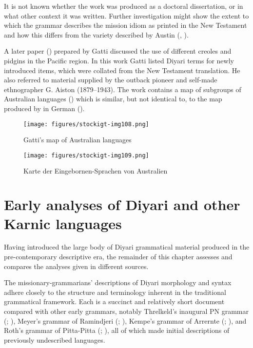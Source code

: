 It is not known whether the work was produced as a doctoral dissertation, or in what other context it was written. Further investigation might show the extent to which the grammar describes the mission idiom as printed in the New Testament and how this differs from the variety described by Austin (\citeyear{austin_grammar_1981}, \citeyear{austin_grammar_2013}).

A later paper (\citeyear{gatti_britannnia_1934}) prepared by Gatti discussed the use of different creoles and pidgins in the Pacific region. In this work Gatti listed Diyari terms for newly introduced items, which were collated from the New Testament translation. He also referred to material supplied by the outback pioneer and self-made ethnographer G. Aiston (1879--1943). The work contains a map of subgroups of Australian languages () which is similar, but not identical to, to the map produced by \citet{schmidt_gliederung_1919} in German ().


\begin{figure}
\texttt{[image: figures/stockigt-img108.png]}
\caption{Gatti's map of Australian languages \citeyearpar{gatti_britannnia_1934}}
\label{bkm:Ref76045165gatti}
\end{figure}

\begin{figure}
\texttt{[image: figures/stockigt-img109.png]}
\caption{Karte der Eingebornen-Sprachen von Australien \citep{schmidt_gliederung_1919}}
\label{bkm:Ref76045165}
\end{figure}

\section{Early analyses of Diyari and other Karnic languages}
\label{sec:key:8.5}\label{bkm:Ref74222915}\label{bkm:Ref339553314}\label{bkm:Ref336762486}\label{bkm:Ref456253749}
Having introduced the large body of Diyari grammatical material produced in the pre-contemporary descriptive era, the remainder of this chapter assesses and compares the analyses given in different sources.

The missionary-grammarians' descriptions of Diyari morphology and syntax adhere closely to the structure and terminology inherent in the traditional grammatical framework. Each is a succinct and relatively short document compared with other early grammars, notably Threlkeld’s inaugural PN grammar (\citeyear{threlkeld_australian_1834}; ), Meyer’s grammar of Ramindjeri (\citeyear{meyer_vocabulary_1843}; ), Kempe’s grammar of Arrernte (\citeyear{kempe_grammar_1891}; ), and Roth’s grammar of Pitta-Pitta (\citeyear{roth_ethnological_1897}; ), all of which made initial descriptions of previously undescribed languages.

